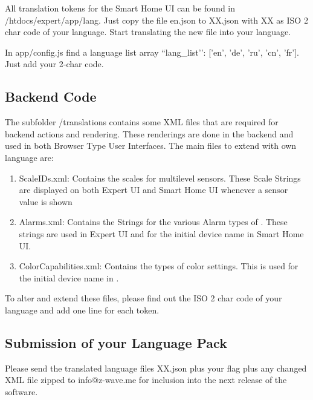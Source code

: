 All translation tokens for the Smart Home UI can be found in /htdocs/expert/app/lang. Just 
copy the file en.json to XX.json with XX as ISO 2 char code of your language. Start 
translating the new file into your language.

In app/config.js find a language list array ``lang\_list’’: ['en', 'de', 'ru', 'cn', 'fr']. 
Just add your 2-char code.

\subsection{Backend Code}

The subfolder /translations contains some XML files that are required for backend 
actions and rendering. These renderings are done in the backend and used in both Browser 
Type User Interfaces. The main files to extend with own language are:
\begin{enumerate}
\item ScaleIDs.xml: Contains the scales for multilevel sensors. These Scale Strings are 
displayed on both Expert UI and Smart Home UI whenever a sensor value is shown
\item Alarms.xml: Contains the Strings for the various Alarm types of \zwave. These 
strings are used in Expert UI and for the initial device name in Smart Home UI.
\item ColorCapabilities.xml: Contains the types of color settings. This is used for 
the initial device name in \zwshui.
\end{enumerate}

To alter and extend these files, please find out the ISO 2 char code of your language and add one line for each token.

\subsection{Submission of your Language Pack}

Please send the translated language files XX.json plus your flag plus any changed XML 
file zipped to info@z-wave.me for inclusion into the next release of the software.